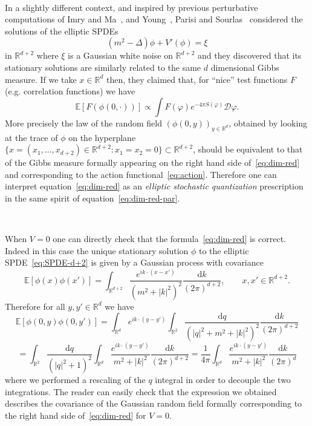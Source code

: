 \documentclass[a4paper,10pt]{article}
\newcommand{\mathd}{\mathrm{d}}
\newcommand{\tmtextit}[1]{{\itshape{#1}}}
\begin{document}
\

In a slightly different context, and inspired by previous perturbative
computations of Imry and Ma~{\cite{imry_random_field_1975}}, and
Young~{\cite{young_lowering_1977}}, Parisi and
Sourlas~{\cite{parisi_random_1979,parisi_supersymmetric_1982}} considered the
solutions of the elliptic SPDEs
\begin{equation}
  (m^2 - \Delta) \phi + V' (\phi) = \xi \label{eq:SPDE-d+2}
\end{equation}
in $\mathbb{R}^{d + 2}$ where $\xi$ is a Gaussian white noise on
$\mathbb{R}^{d + 2}$ and they discovered that its stationary solutions are
similarly related to the same $d$ dimensional Gibbs measure. If we take $x \in
\mathbb{R}^d$ then, they claimed that, for ``nice'' test functions $F$ (e.g.
correlation functions) we have
\begin{equation}
  \mathbb{E} [F (\phi (0, \cdot))] \propto \int F (\varphi) e^{- 4 \pi S
  (\varphi)} \mathcal{D} \varphi . \label{eq:dim-red}
\end{equation}
More precisely the law of the random field $(\phi (0, y))_{y \in
\mathbb{R}^d}$, obtained by looking at the trace of $\phi$ on the hyperplane
$\{ x = (x_1, \ldots, x_{d + 2}) \in \mathbb{R}^{d + 2} : x_1 = x_2 = 0 \}
\subset \mathbb{R}^{d + 2}$, should be equivalent to that of the Gibbs measure
formally appearing on the right hand side of~{\eqref{eq:dim-red}} and
corresponding to the action functional~{\eqref{eq:action}}. Therefore one can
interpret equation~{\eqref{eq:dim-red}} as an \tmtextit{elliptic stochastic
quantization} prescription in the same spirit of
equation~{\eqref{eq:dim-red-par}}.

\

When $V = 0$ one can directly check that the formula~{\eqref{eq:dim-red}} is
correct. Indeed in this case the unique stationary solution $\phi$ to the
elliptic SPDE~{\eqref{eq:SPDE-d+2}} is given by a Gaussian process with
covariance
\[ \mathbb{E} [\phi (x) \phi (x')] = \int_{\mathbb{R}^{d + 2}} \frac{e^{i k
   \cdot (x - x')}}{(m^2 + | k |^2)^2} \frac{\mathd k}{(2 \pi)^{d + 2}},
   \qquad x, x' \in \mathbb{R}^{d + 2} . \]
Therefore for all $y, y' \in \mathbb{R}^d$ we have
\[ \mathbb{E} [\phi (0, y) \phi (0, y')] = \int_{\mathbb{R}^d} e^{i k \cdot (y
   - y')} \int_{\mathbb{R}^2} \frac{\mathd q}{(| q |^2 + m^2 + | k |^2)^2}
   \frac{\mathd k}{(2 \pi)^{d + 2}} \]
\[ = \int_{\mathbb{R}^2} \frac{\mathd q}{(| q |^2 + 1)^2} \int_{\mathbb{R}^d}
   \frac{e^{i k \cdot (y - y')}}{m^2 + | k |^2} \frac{\mathd k}{(2 \pi)^{d +
   2}} = \frac{1}{4 \pi} \int_{\mathbb{R}^d} \frac{e^{i k \cdot (y - y')}}{m^2
   + | k |^2} \frac{\mathd k}{(2 \pi)^d} \]
where we performed a rescaling of the $q$ integral in order to decouple the
two integrations. The reader can easily check that the expression we obtained
describes the covariance of the Gaussian random field formally corresponding
to the right hand side of~{\eqref{eq:dim-red}} for $V = 0$.
\end{document}

